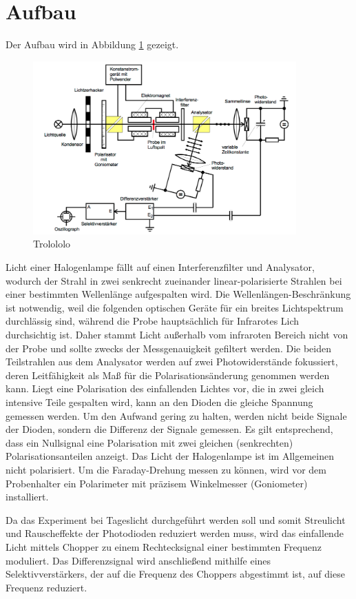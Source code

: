 \section{Aufbau}
\label{sec:Aufbau}
Der Aufbau wird in Abbildung \ref{setup} gezeigt.
\begin{figure}[hp]
    \centering
    \includegraphics[width=0.9\textwidth]{graphics/setup.png}
    \caption{Trolololo \cite{skript}}
    \label{setup}
\end{figure}
Licht einer Halogenlampe fällt auf einen Interferenzfilter und Analysator,
wodurch der Strahl in zwei senkrecht zueinander linear-polarisierte Strahlen bei einer bestimmten Wellenlänge aufgespalten wird.
Die Wellenlängen-Beschränkung ist notwendig, weil die folgenden optischen Geräte für ein breites Lichtspektrum durchlässig sind,
während die Probe hauptsächlich für Infrarotes Lich durchsichtig ist.
Daher stammt Licht außerhalb vom infraroten Bereich nicht von der Probe und sollte zwecks der Messgenauigkeit gefiltert werden.
Die beiden Teilstrahlen aus dem Analysator werden auf zwei Photowiderstände fokussiert,
deren Leitfähigkeit als Maß für die Polarisationsänderung genommen werden kann.
Liegt eine Polarisation des einfallenden Lichtes vor, die in zwei gleich intensive Teile gespalten wird,
kann an den Dioden die gleiche Spannung gemessen werden.
Um den Aufwand gering zu halten, werden nicht beide Signale der Dioden, sondern die Differenz der Signale gemessen.
Es gilt entsprechend, dass ein Nullsignal eine Polarisation mit zwei gleichen (senkrechten) Polarisationsanteilen anzeigt.
Das Licht der Halogenlampe ist im Allgemeinen nicht polarisiert.
Um die Faraday-Drehung messen zu können, wird vor dem Probenhalter ein Polarimeter mit präzisem Winkelmesser (Goniometer) installiert.

Da das Experiment bei Tageslicht durchgeführt werden soll
und somit Streulicht und Rauscheffekte der Photodioden reduziert werden muss,
wird das einfallende Licht mittels Chopper zu einem Rechtecksignal einer bestimmten Frequenz moduliert.
Das Differenzsignal wird anschließend mithilfe eines Selektivverstärkers,
der auf die Frequenz des Choppers abgestimmt ist, auf diese Frequenz reduziert.

